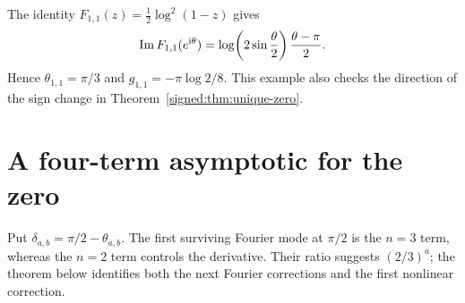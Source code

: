 \begin{remark}
The identity $F_{1,1}(z)=\tfrac12\log^2(1-z)$ gives
\[
 \operatorname{Im} F_{1,1}(e^{\mathrm{i}\theta})
 =\log\!\left(2\sin\frac\theta2\right)\frac{\theta-\pi}{2}.
\]
Hence $\theta_{1,1}=\pi/3$ and $g_{1,1}=-\pi\log2/8$. This example also checks the direction of the sign change in Theorem~\ref{signed:thm:unique-zero}.
\end{remark}

\section{A four-term asymptotic for the zero}
\label{signed:sec:zero-asymptotic}
Put $\delta_{a,b}=\pi/2-\theta_{a,b}$. The first surviving Fourier mode at $\pi/2$ is the $n=3$ term, whereas the $n=2$ term controls the derivative. Their ratio suggests $(2/3)^a$; the theorem below identifies both the next Fourier corrections and the first nonlinear correction.

